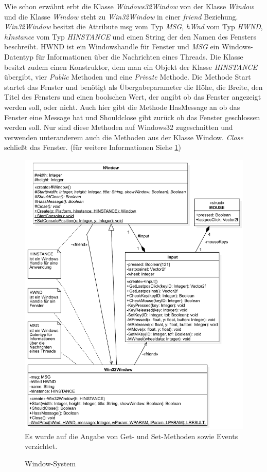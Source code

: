 Wie schon erwähnt erbt die Klasse \textit{Windows32Window} von der Klasse \textit{Window} und die Klasse \textit{Window} steht zu \textit{Win32Window} in einer \textit{friend} Beziehung.
\textit{Win32Window} besitzt die Attribute msg vom Typ \textit{MSG}, \textit{hWnd} vom Typ \textit{HWND}, \textit{hInstance} vom Typ \textit{HINSTANCE} und einen String der den Namen des Fensters beschreibt.
HWND ist ein Windowshandle für Fenster und \textit{MSG} ein Windows-Datentyp für Informationen über die Nachrichten eines Threads. 
Die Klasse besitzt zudem einen Konstruktor, dem man ein Objekt der Klasse \textit{HINSTANCE} übergibt, vier \textit{Public} Methoden und eine \textit{Private} Methode. Die Methode Start startet das Fenster und benötigt als Übergabeparameter die Höhe, die Breite, den Titel des Fensters und einen boolschen Wert, der angibt ob das Fenster angezeigt werden soll, oder nicht.
Auch hier gibt die Methode HasMessage an ob das Fenster eine Message hat und
Shouldclose gibt zurück ob das Fenster geschlossen werden soll. Nur sind diese Methoden auf Windows32 zugeschnitten und verwenden unteranderem auch die Methoden aus der Klasse Window.
\textit{Close} schließt das Fenster. (für weitere Informationen Siehe \cref{Windowsystem})

\begin{figure}
	\begin{center}
		\includegraphics[width=\textwidth]{03unserprogramm/Engine/WindowSystem.pdf}
		Es wurde auf die Angabe von Get- und Set-Methoden sowie Events verzichtet.
		\caption{Window-System}\label{Windowsystem}
	\end{center}
\end{figure}

